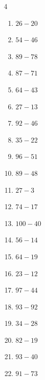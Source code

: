\begin{multicols}{4}
\begin{enumerate}
  \item $26-20$
        \phantom{$=6$}

  \item $54-46$
        \phantom{$=8$}

  \item $89-78$
        \phantom{$=11$}

  \item $87-71$
        \phantom{$=16$}

  \item $64-43$
        \phantom{$=21$}

  \item $27-13$
        \phantom{$=14$}

  \item $92-46$
        \phantom{$=46$}

  \item $35-22$
        \phantom{$=13$}

  \item $96-51$
        \phantom{$=45$}

  \item $89-48$
        \phantom{$=41$}

  \item $27-3$
        \phantom{$=24$}

  \item $74-17$
        \phantom{$=57$}

  \item $100-40$
        \phantom{$=60$}

  \item $56-14$
        \phantom{$=42$}

  \item $64-19$
        \phantom{$=45$}

  \item $23-12$
        \phantom{$=11$}

  \item $97-44$
        \phantom{$=53$}

  \item $93-92$
        \phantom{$=1$}

  \item $34-28$
        \phantom{$=6$}

  \item $82-19$
        \phantom{$=63$}

  \item $93-40$
        \phantom{$=53$}

  \item $91-73$
        \phantom{$=18$}


\end{enumerate}
\end{multicols}

